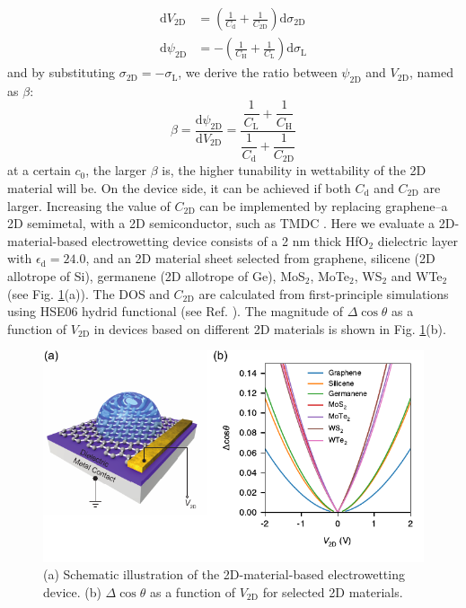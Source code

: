 \documentclass[aps,prl,reprint,groupedaddress,amsmath,amssymb, showpacs]{revtex4-1}
\begin{document}
\begin{align}
\label{eqn:dV-sigma-2D}
\mathrm{d} V_{\mathrm{2D}} &= \left(\frac{1}{C_{\mathrm{d}}} +
\frac{1}{C_{\mathrm{2D}}}\right) \mathrm{d}\sigma_{\mathrm{2D}} \\
\label{eqn:dpsi-sigma-L}
\mathrm{d} \psi_{\mathrm{2D}} &= -\left( \frac{1}{C_{\mathrm{H}}}
+ \frac{1}{C_{\mathrm{L}}} \right) \mathrm{d}\sigma_{\mathrm{L}}
\end{align}
and by substituting \(\sigma_{\mathrm{2D}} = -\sigma_{\mathrm{L}}\), we derive the ratio between \(\psi_{\mathrm{2D}}\) and \(V_{\mathrm{2D}}\), named as \(\beta\):
\begin{equation}
\label{eqn:beta}
\beta = \frac{\mathrm{d} \psi_{\mathrm{2D}}}{\mathrm{d}
V_{\mathrm{2D}}} = \dfrac{\dfrac{1}{C_{\mathrm{L}}} +
\dfrac{1}{C_{\mathrm{H}}}}{\dfrac{1}{C_{\mathrm{d}}} + \dfrac{1}{C_{\mathrm{2D}}}}
\end{equation}
at a certain \(c_{0}\), the larger \(\beta\) is, the higher tunability in
wettability of the 2D material will be. On the device side, it can be
achieved if both \(C_{\mathrm{d}}\) and \(C_{\mathrm{2D}}\) are
larger. Increasing the value of \(C_{\mathrm{2D}}\) can be implemented
by replacing graphene--a 2D semimetal, with a 2D semiconductor, such
as TMDC \cite{tian_multiscale_2016}. Here we evaluate a
2D-material-based electrowetting device consists of a 2 nm thick HfO\(_{\text{2}}\)
dielectric layer with \(\epsilon_{\mathrm{d}}=24.0\), and an 2D material sheet
selected from graphene, silicene (2D allotrope of Si), germanene (2D
allotrope of Ge), MoS\(_{\text{2}}\), MoTe\(_{\text{2}}\), WS\(_{\text{2}}\) and WTe\(_{\text{2}}\) (see
Fig. \ref{fig:dcos-all-2D}(a)). The DOS and \(C_{\mathrm{2D}}\) are
calculated from first-principle simulations using HSE06 hydrid
functional (see Ref. \cite{tian_multiscale_2016}). The magnitude of \(\Delta \cos \theta\) as a function of \(V_{\mathrm{2D}}\) in devices based on different 2D materials is shown in Fig. \ref{fig:dcos-all-2D}(b).
\begin{figure}[htbp]
\centering
\includegraphics[width=0.95\linewidth]{../img/dcos-all-2D.pdf}
\caption{\label{fig:dcos-all-2D}
(a) Schematic illustration of the 2D-material-based electrowetting device. (b) \(\Delta\cos\theta\) as a function of \(V_{\mathrm{2D}}\) for selected 2D materials.}
\end{figure}
\end{document}
